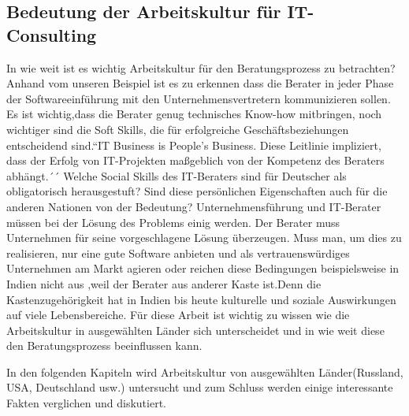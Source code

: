 	\subsection{Bedeutung der Arbeitskultur für IT-Consulting}
In wie weit ist es wichtig Arbeitskultur für den Beratungsprozess zu betrachten? Anhand vom unseren Beispiel ist es zu erkennen dass die Berater in jeder Phase der Softwareeinführung mit den Unternehmensvertretern kommunizieren sollen. Es ist wichtig,dass die Berater genug technisches Know-how mitbringen, noch wichtiger sind die Soft Skills, die für erfolgreiche Geschäftsbeziehungen entscheidend sind.``IT Business is People's Business. Diese Leitlinie impliziert, dass der Erfolg von IT-Projekten maßgeblich von der Kompetenz des Beraters abhängt.´´
 Welche Social Skills des IT-Beraters sind für Deutscher als obligatorisch herausgestuft? Sind diese persönlichen Eigenschaften auch für die anderen Nationen von der Bedeutung? Unternehmensführung und IT-Berater müssen bei der Lösung des Problems einig werden. Der Berater muss Unternehmen für seine vorgeschlagene Lösung überzeugen. Muss man, um dies zu realisieren, nur eine gute Software anbieten und als vertrauenswürdiges Unternehmen am Markt agieren oder reichen diese Bedingungen beispielsweise in Indien nicht aus ,weil der Berater aus anderer Kaste ist.Denn die Kastenzugehörigkeit hat in Indien bis heute kulturelle und soziale Auswirkungen auf viele Lebensbereiche. %
 Für diese Arbeit ist wichtig zu wissen wie die Arbeitskultur in ausgewählten Länder sich unterscheidet und in wie weit diese den Beratungsprozess beeinflussen kann.
 



In den folgenden Kapiteln wird Arbeitskultur von ausgewählten Länder(Russland, USA, Deutschland usw.) untersucht und zum Schluss werden einige interessante Fakten verglichen und diskutiert. 


